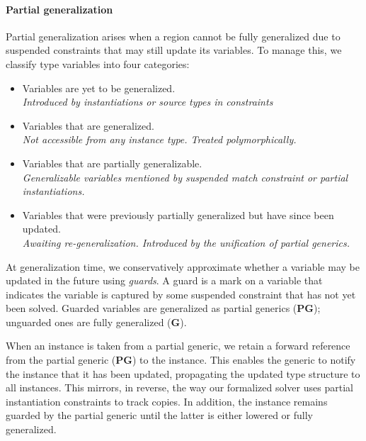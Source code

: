 \documentclass[acmsmall,screen,nonacm,review]{acmart}
\begin{document}
\paragraph{Partial generalization}

Partial generalization arises when a region cannot be fully
generalized due to suspended constraints that may still update
its variables. To manage this, we classify type variables
into four categories:
\begin{itemize}
  \let \Item \item
  \renewcommand \item [1][]{\Item[(\textbf{#1})]}
  \item[I] Variables are yet to be generalized. \\
    \emph{Introduced by instantiations or source types in constraints}

  \item[G] Variables that are generalized. \\
    \emph{Not accessible from any instance type. Treated polymorphically.}

  \item[PG] Variables that are partially generalizable. \\
    \emph{Generalizable variables mentioned by suspended match constraint or partial
    instantiations.}

  \item[PI] Variables that were previously partially generalized
    but have since been updated.  \\
    \emph{Awaiting re-generalization. Introduced by the unification of partial
    generics.}
\end{itemize}
At generalization time, we conservatively approximate whether a variable may be
updated in the future using \emph{guards}. A guard is a mark on a variable that
indicates the variable is captured by some suspended constraint that has not
yet been solved. Guarded variables are generalized as partial generics (\textbf{PG});
unguarded ones are fully generalized (\textbf{G}).

When an instance is taken from a partial generic, we retain a forward reference
from the partial generic (\textbf{PG}) to the instance. This enables the
generic to notify the instance that it has been updated, propagating the
updated type structure to all instances. This mirrors, in reverse, the way our
formalized solver uses partial instantiation constraints to track copies. In
addition, the instance remains guarded by the partial generic until the latter
is either lowered or fully generalized.
\end{document}
